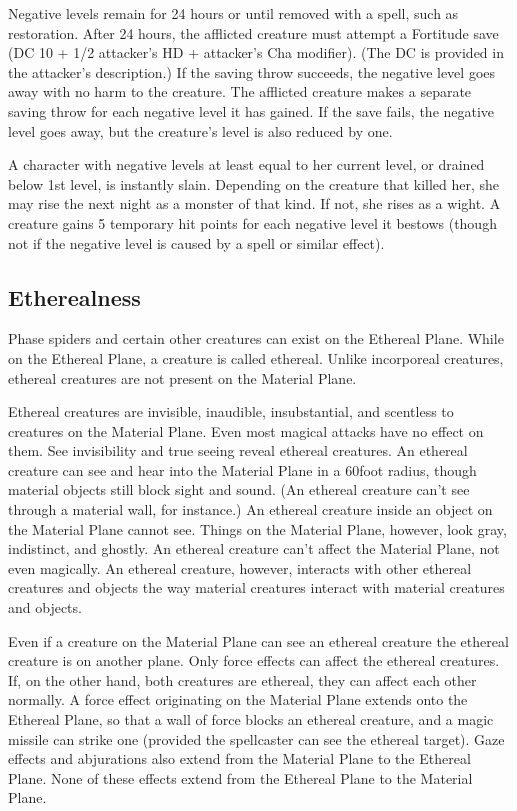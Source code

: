 Negative levels remain for 24 hours or until removed with a spell, such as restoration. After 24 hours, the afflicted creature must attempt a Fortitude save (DC 10 + 1/2 attacker's HD + attacker's Cha modifier). (The DC is provided in the attacker's description.) If the saving throw succeeds, the negative level goes away with no harm to the creature. The afflicted creature makes a separate saving throw for each negative level it has gained. If the save fails, the negative level goes away, but the creature's level is also reduced by one.

A character with negative levels at least equal to her current level, or drained below 1st level, is instantly slain. Depending on the creature that killed her, she may rise the next night as a monster of that kind. If not, she rises as a wight. A creature gains 5 temporary hit points for each negative level it bestows (though not if the negative level is caused by a spell or similar effect).

\subsection{Etherealness}

Phase spiders and certain other creatures can exist on the Ethereal Plane. While on the Ethereal Plane, a creature is called ethereal. Unlike incorporeal creatures, ethereal creatures are not present on the Material Plane.

Ethereal creatures are invisible, inaudible, insubstantial, and scentless to creatures on the Material Plane. Even most magical attacks have no effect on them. See invisibility and true seeing reveal ethereal creatures.
An ethereal creature can see and hear into the Material Plane in a 60\textendash foot radius, though material objects still block sight and sound. (An ethereal creature can't see through a material wall, for instance.) An ethereal creature inside an object on the Material Plane cannot see. Things on the Material Plane, however, look gray, indistinct, and ghostly. An ethereal creature can't affect the Material Plane, not even magically. An ethereal creature, however, interacts with other ethereal creatures and objects the way material creatures interact with material creatures and objects.

Even if a creature on the Material Plane can see an ethereal creature the ethereal creature is on another plane. Only force effects can affect the ethereal creatures. If, on the other hand, both creatures are ethereal, they can affect each other normally.
A force effect originating on the Material Plane extends onto the Ethereal Plane, so that a wall of force blocks an ethereal creature, and a magic missile can strike one (provided the spellcaster can see the ethereal target). Gaze effects and abjurations also extend from the Material Plane to the Ethereal Plane. None of these effects extend from the Ethereal Plane to the Material Plane.

